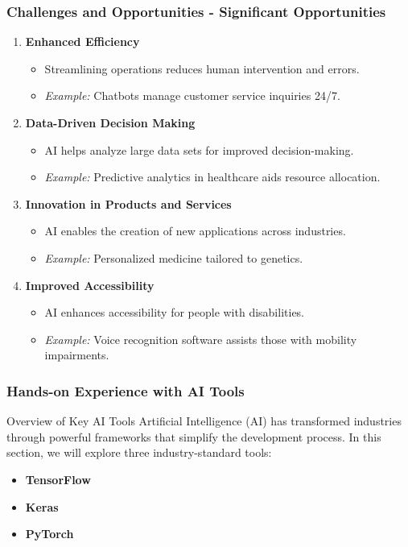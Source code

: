 \documentclass{beamer}
\begin{document}
\begin{frame}[fragile]
    \frametitle{Challenges and Opportunities - Significant Opportunities}
    \begin{enumerate}
        \item \textbf{Enhanced Efficiency}
            \begin{itemize}
                \item Streamlining operations reduces human intervention and errors.
                \item \textit{Example:} Chatbots manage customer service inquiries 24/7.
            \end{itemize}

        \item \textbf{Data-Driven Decision Making}
            \begin{itemize}
                \item AI helps analyze large data sets for improved decision-making.
                \item \textit{Example:} Predictive analytics in healthcare aids resource allocation.
            \end{itemize}

        \item \textbf{Innovation in Products and Services}
            \begin{itemize}
                \item AI enables the creation of new applications across industries.
                \item \textit{Example:} Personalized medicine tailored to genetics.
            \end{itemize}

        \item \textbf{Improved Accessibility}
            \begin{itemize}
                \item AI enhances accessibility for people with disabilities.
                \item \textit{Example:} Voice recognition software assists those with mobility impairments.
            \end{itemize}
    \end{enumerate}
\end{frame}

\begin{frame}[fragile]
    \frametitle{Hands-on Experience with AI Tools}
    \begin{block}{Overview of Key AI Tools}
        Artificial Intelligence (AI) has transformed industries through powerful frameworks that simplify the development process. In this section, we will explore three industry-standard tools:
        \begin{itemize}
            \item \textbf{TensorFlow}
            \item \textbf{Keras}
            \item \textbf{PyTorch}
        \end{itemize}
    \end{block}
\end{frame}
\end{document}
